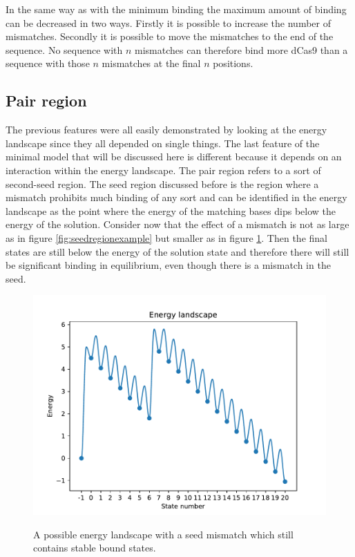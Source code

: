 In the same way as with the minimum binding the maximum amount of binding can be decreased in two ways. Firstly it is possible to increase the number of mismatches. Secondly it is possible to move the mismatches to the end of the sequence. No sequence with $n$ mismatches can therefore bind more dCas9 than a sequence with those $n$ mismatches at the final $n$ positions.

\subsection{Pair region}
\label{sec:TheoryPair}

The previous features were all easily demonstrated by looking at the energy landscape since they all depended on single things. The last feature of the minimal model that will be discussed here is different because it depends on an interaction within the energy landscape. The pair region refers to a sort of second-seed region. The seed region discussed before is the region where a mismatch prohibits much binding of any sort and can be identified in the energy landscape as the point where the energy of the matching bases dips below the energy of the solution. Consider now that the effect of a mismatch is not as large as in figure \ref{fig:seedregionexample} but smaller as in figure \ref{fig:pairexample1}. Then the final states are still below the energy of the solution state and therefore there will still be significant binding in equilibrium, even though there is a mismatch in the seed.

\begin{figure}[H]
\begin{center}
\includegraphics[width=\textwidth]{images/pairexample1}
\label{fig:pairexample1}
\caption{A possible energy landscape with a seed mismatch which still contains stable bound states.}
\end{center}
\end{figure}

